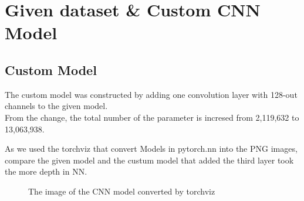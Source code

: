 \section{Given dataset \& Custom CNN Model}
\subsection{Custom Model}
The custom model was constructed by adding one convolution layer with 128-out channels to the given model.\\
From the change, the total number of the parameter is incresed from 2,119,632 to 13,063,938.

As we used the torchviz that convert Models in pytorch.nn into the PNG images, compare the given model and the custum model that added the third layer took the more depth in NN.
\begin{figure}[h!]
\centering
{}
\caption{The image of the CNN model converted by torchviz }
\end{figure}
